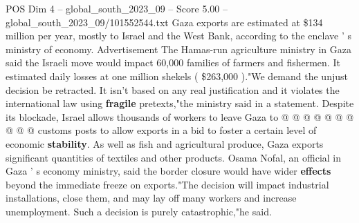 \begin{textsample}{POS Dim 4 – global\_south\_2023\_09 – Score 5.00 – global\_south\_2023\_09/101552544.txt}
Gaza exports are estimated at \$134 million per year, mostly to Israel and the West Bank, according to the enclave ' s ministry of economy.
Advertisement The Hamas-run agriculture ministry in Gaza said the Israeli move would impact 60,000 families of farmers and fishermen.
It estimated daily losses at one million shekels ( \$263,000 )."We demand the unjust decision be retracted.
It isn't based on any real justification and it violates the international law using \textbf{fragile} pretexts,"the ministry said in a statement.
Despite its blockade, Israel allows thousands of workers to leave Gaza to @ @ @ @ @ @ @ @ @ @ customs posts to allow exports in a bid to foster a certain level of economic \textbf{stability}.
As well as fish and agricultural produce, Gaza exports significant quantities of textiles and other products.
Osama Nofal, an official in Gaza ' s economy ministry, said the border closure would have wider \textbf{effects} beyond the immediate freeze on exports."The decision will impact industrial installations, close them, and may lay off many workers and increase unemployment.
Such a decision is purely catastrophic,"he said.

\end{textsample}
